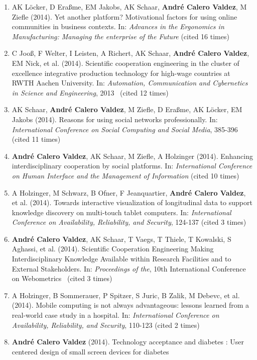 \documentclass[11pt,a4paper,sans]{moderncv}
\begin{document}
\begin{enumerate}
{  demographischen Wandels}
\item
  AK Löcker, D Eraßme, EM Jakobs, AK Schaar, \textbf{André Calero
  Valdez}, M Ziefle (2014). Yet another platform? Motivational factors
  for using online communities in business contexts. In: \emph{Advances
  in the Ergonomics in Manufacturing: Managing the enterprise of the
  Future} (cited 16 times)
\item
  C Jooß, F Welter, I Leisten, A Richert, AK Schaar, \textbf{André
  Calero Valdez}, EM Nick, et al. (2014). Scientific cooperation
  engineering in the cluster of excellence integrative production
  technology for high-wage countries at RWTH Aachen University. In:
  \emph{Automation, Communication and Cybernetics in Science and
  Engineering}, 2013~ (cited 12 times)
\item
  AK Schaar, \textbf{André Calero Valdez}, M Ziefle, D Eraßme, AK
  Löcker, EM Jakobs (2014). Reasons for using social networks
  professionally. In: \emph{International Conference on Social Computing
  and Social Media}, 385-396 (cited 11 times)
\item
  \textbf{André Calero Valdez}, AK Schaar, M Ziefle, A Holzinger (2014).
  Enhancing interdisciplinary cooperation by social platforms. In:
  \emph{International Conference on Human Interface and the Management
  of Information} (cited 10 times)
\item
  A Holzinger, M Schwarz, B Ofner, F Jeanquartier, \textbf{André Calero
  Valdez}, et al. (2014). Towards interactive visualization of
  longitudinal data to support knowledge discovery on multi-touch tablet
  computers. In: \emph{International Conference on Availability,
  Reliability, and Security}, 124-137 (cited 3 times)
\item
  \textbf{André Calero Valdez}, AK Schaar, T Vaegs, T Thiele, T
  Kowalski, S Aghassi, et al. (2014). Scientific Cooperation Engineering
  Making Interdisciplinary Knowledge Available within Research
  Facilities and to External Stakeholders. In: \emph{Proceedings of
  the}, 10th International Conference on Webometrics~ (cited 3 times)
\item
  A Holzinger, B Sommerauer, P Spitzer, S Juric, B Zalik, M Debevc, et
  al. (2014). Mobile computing is not always advantageous: lessons
  learned from a real-world case study in a hospital. In:
  \emph{International Conference on Availability, Reliability, and
  Security}, 110-123 (cited 2 times)
\item
  \textbf{André Calero Valdez} (2014). Technology acceptance and
  diabetes : User centered design of small screen devices for diabetes

\end{enumerate}
\end{document}

